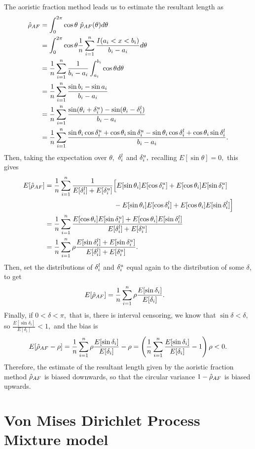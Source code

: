 The aoristic fraction method leads us to estimate the resultant length as
\begin{align}
\hat\rho_{AF} &= \int_0^{2\pi} \cos\theta  ~ \hat{p}_{AF}(\theta) d\theta \\
&= \int_0^{2\pi} \cos\theta \frac{1}{n}\sum_{i=1}^n \frac{I(a_i < x < b_i)}{b_i - a_i} d\theta \\
&= \frac{1}{n}\sum_{i=1}^n  \frac{1}{b_i - a_i}  \int_{a_i}^{b_i} \cos\theta d\theta \\
&= \frac{1}{n}\sum_{i=1}^n  \frac{\sin b_i - \sin a_i}{b_i - a_i} \\
&= \frac{1}{n}\sum_{i=1}^n  \frac{\sin(\theta_i + {\delta^u_i}) - \sin(\theta_i - {\delta^l_i})}{b_i - a_i} \\
&= \frac{1}{n}\sum_{i=1}^n  \frac{\sin \theta_i \cos{\delta^u_i} + \cos \theta_i \sin{\delta^u_i} - \sin \theta_i \cos{\delta^l_i} + \cos \theta_i \sin{\delta^l_i}}{b_i - a_i}.
\end{align}
Then, taking the expectation over $\theta,$ ${\delta^l_i}$ and ${\delta^u_i},$ recalling $E[\sin\theta] = 0,$ this gives
\begin{align}
E[\hat\rho_{AF}] &= \frac{1}{n}\sum_{i=1}^n \frac{1}{E[{\delta^l_i}] + E[{\delta^u_i}]} \Big[ E[\sin \theta_i] E[\cos{\delta^u_i}] + E[\cos \theta_i] E[ \sin{\delta^u_i}] \\
& \qquad \qquad \qquad \qquad \qquad  - E[\sin \theta_i] E[\cos{\delta^l_i}] + E[\cos \theta_i] E[\sin{\delta^l_i}] \Big] \\
&= \frac{1}{n}\sum_{i=1}^n \frac{E[\cos \theta_i] E[\sin{\delta^u_i}] + E[\cos \theta_i] E[\sin{\delta^l_i}]}{E[{\delta^l_i}] + E[{\delta^u_i}]}  \\
&= \frac{1}{n}\sum_{i=1}^n \rho  \frac{E[\sin{\delta^l_i}] + E[\sin{\delta^u_i}]}{E[{\delta^l_i}] + E[{\delta^u_i}]}.
\end{align}
Then, set the distributions of ${\delta^l_i}$ and ${\delta^u_i}$ equal again to the distribution of some $\delta$, to get
\begin{align}
E[\hat\rho_{AF}]&= \frac{1}{n}\sum_{i=1}^n \rho  \frac{E[\sin\delta_i]}{E[\delta_i]}.
\end{align}
Finally, if $0 < \delta < \pi,$ that is, there is interval censoring, we know that $\sin\delta < \delta,$ so $\frac{E[\sin\delta_i]}{E[\delta_i]} < 1,$ and the bias is
\begin{equation}
E[\hat\rho_{AF} - \rho] = \frac{1}{n}\sum_{i=1}^n \rho  \frac{E[\sin\delta_i]}{E[\delta_i]} - \rho  = \left(\frac{1}{n}\sum_{i=1}^n  \frac{E[\sin\delta_i]}{E[\delta_i]} - 1\right) \rho < 0.
\end{equation}
Therefore, the estimate of the resultant length given by the aoristic fraction method $\hat\rho_{AF}$ is biased downwards, so that the circular variance $1 - \hat\rho_{AF}$ is biased upwards.

\newpage

\section{Von Mises Dirichlet Process Mixture model} \label{dpmdetails}

